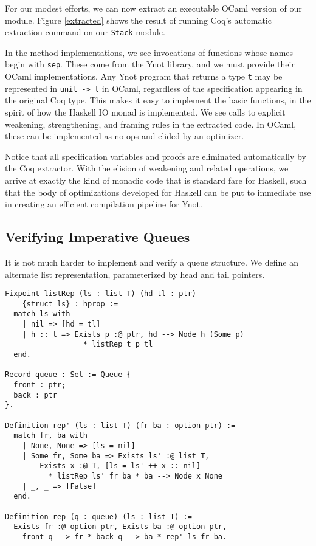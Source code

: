 \documentclass[preprint,nocopyrightspace]{sigplanconf}
\newcommand{\cd}[1]{\texttt{#1}}
\begin{document}
For our modest efforts, we can now extract an executable OCaml version of our module.  Figure \ref{extracted} shows the result of running Coq's automatic extraction command on our \cd{Stack} module.

In the method implementations, we see invocations of functions whose names begin with \cd{sep}.  These come from the Ynot library, and we must provide their OCaml implementations.  Any Ynot program that returns a type \cd{t} may be represented in \cd{unit -> t} in OCaml, regardless of the specification appearing in the original Coq type.  This makes it easy to implement the basic functions, in the spirit of how the Haskell IO monad is implemented.  We see calls to explicit weakening, strengthening, and framing rules in the extracted code.  In OCaml, these can be implemented as no-ops and elided by an optimizer.

Notice that all specification variables and proofs are eliminated automatically by the Coq extractor.  With the elision of weakening and related operations, we arrive at exactly the kind of monadic code that is standard fare for Haskell, such that the body of optimizations developed for Haskell can be put to immediate use in creating an efficient compilation pipeline for Ynot.


\subsection{Verifying Imperative Queues}

It is not much harder to implement and verify a queue structure.  We define an alternate list representation, parameterized by head and tail pointers.

\begin{verbatim}
Fixpoint listRep (ls : list T) (hd tl : ptr)
    {struct ls} : hprop :=
  match ls with
    | nil => [hd = tl]
    | h :: t => Exists p :@ ptr, hd --> Node h (Some p)
                  * listRep t p tl
  end.

Record queue : Set := Queue {
  front : ptr;
  back : ptr
}.

Definition rep' (ls : list T) (fr ba : option ptr) :=
  match fr, ba with
    | None, None => [ls = nil]
    | Some fr, Some ba => Exists ls' :@ list T,
        Exists x :@ T, [ls = ls' ++ x :: nil]
          * listRep ls' fr ba * ba --> Node x None
    | _, _ => [False]
  end.
          
Definition rep (q : queue) (ls : list T) :=
  Exists fr :@ option ptr, Exists ba :@ option ptr,
    front q --> fr * back q --> ba * rep' ls fr ba.
\end{verbatim}
\end{document}
